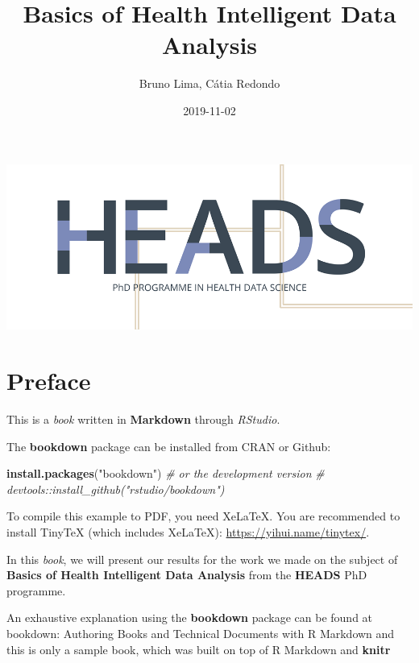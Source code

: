\documentclass[]{book}
\title{Basics of Health Intelligent Data Analysis}
\author{Bruno Lima, Cátia Redondo}
\date{2019-11-02}
\newenvironment{Shaded}{\begin{snugshade}}{\end{snugshade}}
\newcommand{\KeywordTok}[1]{\textcolor[rgb]{0.13,0.29,0.53}{\textbf{#1}}}
\newcommand{\StringTok}[1]{\textcolor[rgb]{0.31,0.60,0.02}{#1}}
\newcommand{\CommentTok}[1]{\textcolor[rgb]{0.56,0.35,0.01}{\textit{#1}}}
\newcommand{\NormalTok}[1]{#1}
\begin{document}
\maketitle

{
\setcounter{tocdepth}{1}
\tableofcontents
}
\chapter*{}\label{section}

\includegraphics{images/heads.png}

\chapter*{Preface}\label{preface}

This is a \emph{book} written in \textbf{Markdown} through
\emph{RStudio}.

The \textbf{bookdown} package \citep{xie2015} can be installed from CRAN
or Github:

\begin{Shaded}
\begin{Highlighting}[]
\KeywordTok{install.packages}\NormalTok{(}\StringTok{"bookdown"}\NormalTok{)}
\CommentTok{# or the development version}
\CommentTok{# devtools::install_github("rstudio/bookdown")}
\end{Highlighting}
\end{Shaded}

To compile this example to PDF, you need XeLaTeX. You are recommended to
install TinyTeX (which includes XeLaTeX):
\url{https://yihui.name/tinytex/}.

In this \emph{book}, we will present our results for the work we made on
the subject of \textbf{Basics of Health Intelligent Data Analysis} from
the \textbf{HEADS} PhD programme.

An exhaustive explanation using the \textbf{bookdown} package
\citep{R-bookdown} can be found at bookdown: Authoring Books and
Technical Documents with R Markdown and this is only a sample book,
which was built on top of R Markdown and \textbf{knitr}
\end{document}
